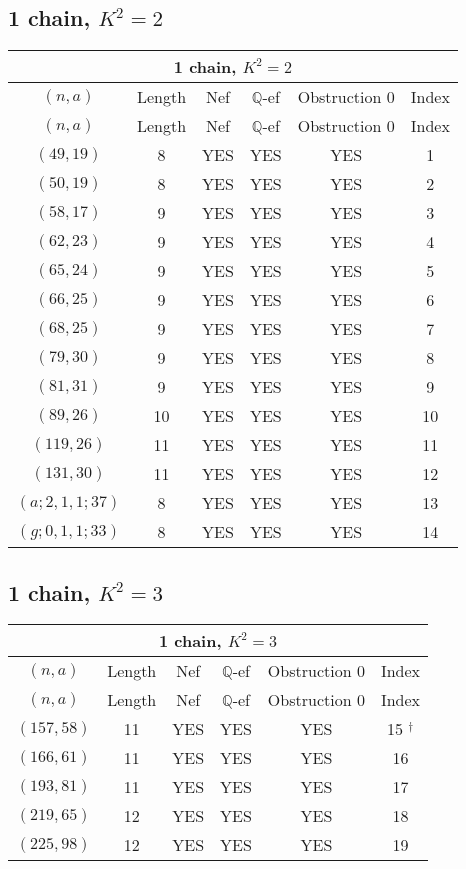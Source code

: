 \subsection{1 chain, \(K^2 = 2\)}
\begin{longtable}{|c|c|c|c|c|c|}
\hline
\multicolumn{6}{|c|}{1 chain, $K^2 = 2$}\\
\hline
$(n,a)$ & Length & Nef & $\mathbb Q$-ef & Obstruction 0 & Index\\
\hline
\endfirsthead

\hline
$(n,a)$ & Length & Nef & $\mathbb Q$-ef & Obstruction 0 & Index\\
\hline
\endhead
\hline
\endfoot

$(49, 19)$ & 8 & YES & YES & YES & 1\\
$(50, 19)$ & 8 & YES & YES & YES & 2\\
$(58, 17)$ & 9 & YES & YES & YES & 3\\
$(62, 23)$ & 9 & YES & YES & YES & 4\\
$(65, 24)$ & 9 & YES & YES & YES & 5\\
$(66, 25)$ & 9 & YES & YES & YES & 6\\
$(68, 25)$ & 9 & YES & YES & YES & 7\\
$(79, 30)$ & 9 & YES & YES & YES & 8\\
$(81, 31)$ & 9 & YES & YES & YES & 9\\
$(89, 26)$ & 10 & YES & YES & YES & 10\\
$(119, 26)$ & 11 & YES & YES & YES & 11\\
$(131, 30)$ & 11 & YES & YES & YES & 12\\
$(a; 2, 1, 1; 37)$ & 8 & YES & YES & YES & 13\\
$(g; 0, 1, 1; 33)$ & 8 & YES & YES & YES & 14
\end{longtable}
\subsection{1 chain, \(K^2 = 3\)}
\begin{longtable}{|c|c|c|c|c|c|}
\hline
\multicolumn{6}{|c|}{1 chain, $K^2 = 3$}\\
\hline
$(n,a)$ & Length & Nef & $\mathbb Q$-ef & Obstruction 0 & Index\\
\hline
\endfirsthead

\hline
$(n,a)$ & Length & Nef & $\mathbb Q$-ef & Obstruction 0 & Index\\
\hline
\endhead
\hline
\endfoot

$(157, 58)$ & 11 & YES & YES & YES & 15 ${}^\dagger$\\
$(166, 61)$ & 11 & YES & YES & YES & 16\\
$(193, 81)$ & 11 & YES & YES & YES & 17\\
$(219, 65)$ & 12 & YES & YES & YES & 18\\
$(225, 98)$ & 12 & YES & YES & YES & 19
\end{longtable}
